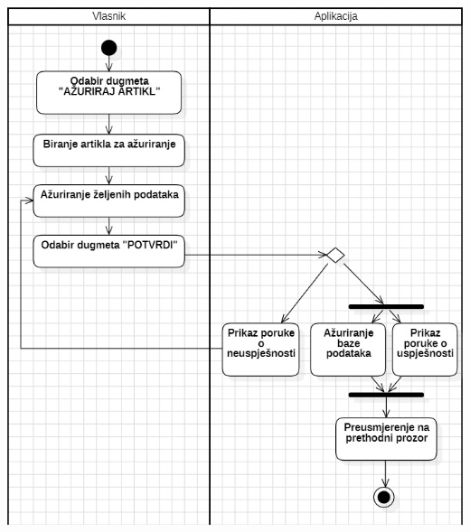 \documentclass{scrreprt}
\begin{document}
\begin{center}
	\includegraphics[width=14cm]{./img/08.png}
\end{center}

\pagebreak
\end{document}
